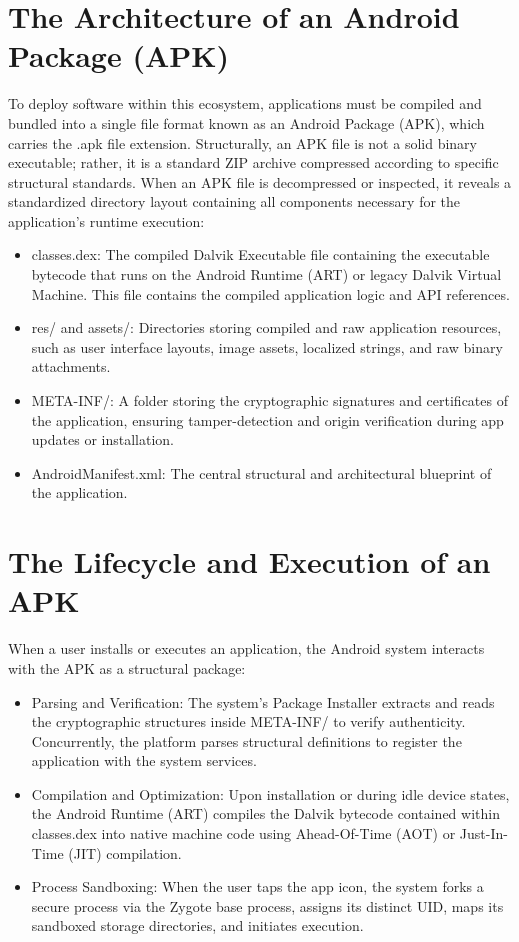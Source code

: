 \section{ The Architecture of an Android Package (APK)}
To deploy software within this ecosystem, applications must be compiled and bundled into a single file format known as an Android Package (APK), which carries the .apk file extension. Structurally, an APK file is not a solid binary executable; rather, it is a standard ZIP archive compressed according to specific structural standards. When an APK file is decompressed or inspected, it reveals a standardized directory layout containing all components necessary for the application's runtime execution:
\begin{itemize}
  \item classes.dex: The compiled Dalvik Executable file containing the executable bytecode that runs on the Android Runtime (ART) or legacy Dalvik Virtual Machine. This file contains the compiled application logic and API references.
  \item 
res/ and assets/: Directories storing compiled and raw application resources, such as user interface layouts, image assets, localized strings, and raw binary attachments.
\item META-INF/: A folder storing the cryptographic signatures and certificates of the application, ensuring tamper-detection and origin verification during app updates or installation.

\item AndroidManifest.xml: The central structural and architectural blueprint of the application.
\end{itemize}





\section{ The Lifecycle and Execution of an APK}
When a user installs or executes an application, the Android system interacts with the APK as a structural package:
\begin{itemize}
 
\item Parsing and Verification: The system's Package Installer extracts and reads the cryptographic structures inside META-INF/ to verify authenticity. Concurrently, the platform parses structural definitions to register the application with the system services.

\item Compilation and Optimization: Upon installation or during idle device states, the Android Runtime (ART) compiles the Dalvik bytecode contained within classes.dex into native machine code using Ahead-Of-Time (AOT) or Just-In-Time (JIT) compilation.

\item Process Sandboxing: When the user taps the app icon, the system forks a secure process via the Zygote base process, assigns its distinct UID, maps its sandboxed storage directories, and initiates execution.

\end{itemize}
